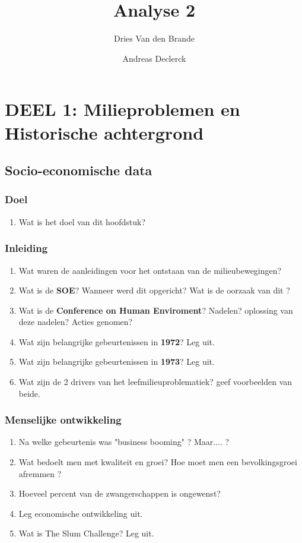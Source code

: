 \documentclass[12pt]{article}
\begin{document}
    \title{Analyse 2}
    \author{Dries Van den Brande \and Andreas Declerck}

    \maketitle

    \section{DEEL 1: Milieproblemen en Historische achtergrond}
    \subsection{Socio-economische data}
    \subsubsection{Doel}
    \begin{enumerate}
        \item Wat is het doel van dit hoofdstuk?
    \end{enumerate}

    \subsubsection{Inleiding}
    \begin{enumerate}
        \item Wat waren de aanleidingen voor het ontstaan van de milieubewegingen?
        \item Wat is de \textbf{SOE}? Wanneer werd dit opgericht? Wat is de oorzaak van dit ?
        \item Wat is de \textbf{Conference on Human Enviroment}? Nadelen? oplossing van deze nadelen? Acties genomen?
        \item Wat zijn belangrijke gebeurtenissen in \textbf{1972}? Leg uit.
        \item Wat zijn belangrijke gebeurtenissen in \textbf{1973}? Leg uit.
        \item Wat zijn de 2 drivers van het leefmilieuproblematiek? geef voorbeelden van beide.
    \end{enumerate}

    \subsubsection{Menselijke ontwikkeling}
    \begin{enumerate}
        \item Na welke gebeurtenis was "business booming" ? Maar.... ?
        \item Wat bedoelt men met kwaliteit en groei? Hoe moet men een bevolkingsgroei afremmen ?
        \item Hoeveel percent van de zwangerschappen is ongewenst?
        \item Leg economische ontwikkeling uit. 
        \item Wat is The Slum Challenge? Leg uit.
    \end{enumerate}
\end{document}
